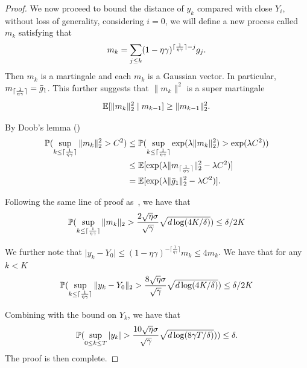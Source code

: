 \begin{proof}
We now proceed to bound the distance of $y_k$ compared with close $Y_i$, without loss of generality, considering $i = 0$, we will define a new process called $m_k$ satisfying that
\begin{align*}
    m_k = \sum_{j \le k} (1 - \eta \gamma)^{\lceil\frac{1}{\eta \gamma} \rceil - j} {g}_j. 
\end{align*}
Then $m_k$ is a martingale and each $m_k$ is a Gaussian vector. In particular, $m_{\lceil\frac{1}{\eta \gamma}\rceil} = \bar {{g}}_1$. This further suggests that $\| m_k \|^2$ is a super martingale
\begin{align*}
    \mathbb{E}[\| m_k \|_2^2 \mid m_{k - 1}] \ge \| m_{k - 1} \|_2^2.
\end{align*}




By Doob's lemma ()
\begin{align*}
    \mathbb{P}(\sup_{k \le \lceil\frac{1}{\eta \gamma} \rceil} \| m_k \|_2^2 > C^2) &\le
    \mathbb{P}(\sup_{k \le \lceil\frac{1}{\eta \gamma} \rceil} \exp(\lambda  \| m_k \|_2^2 ) > \exp(\lambda C^2))\\
    &\le \mathbb{E}[{\exp(\lambda \| m_{\lceil\frac{1}{\eta \gamma} \rceil } \|_2^2 - \lambda C^2)}]\\
    &= \mathbb{E}[{\exp(\lambda \| \bar g_1 \|_2^2 - \lambda C^2)}].
\end{align*}

Following the same line of proof as~, we have that 
\begin{align*}
 \mathbb{P}(\sup_{k \le \lceil\frac{1}{\eta \gamma} \rceil} \| m_k \|_2 > \frac{2 \sqrt{\eta} \sigma}{\sqrt{\gamma}} \sqrt{d \log(4K/\delta)}) \le \delta / 2K
\end{align*}



We further note that $\Big | y_k - Y_0 \Big | \le (1 - \eta \gamma)^{-\lceil\frac{1}{\eta \gamma} \rceil} m_k \le 4 m_k$. We have that for any $k < K$
\begin{align*}
 \mathbb{P}(\sup_{k \le \lceil\frac{1}{\eta \gamma} \rceil} \| y_k - Y_0 \|_2 > \frac{8 \sqrt{\eta} \sigma}{\sqrt{\gamma}} \sqrt{d \log(4K/\delta)}) \le \delta / 2K
\end{align*}

Combining with the bound on $Y_k$, we have that
\begin{align*}
    \mathbb{P}(\sup_{0 \le k \le T} |y_k| > \frac{10 \sqrt{\eta} \sigma}{\sqrt{\gamma}} \sqrt{d \log(8\gamma T/\delta)}))  \le \delta.
\end{align*}
The proof is then complete.
\end{proof}





